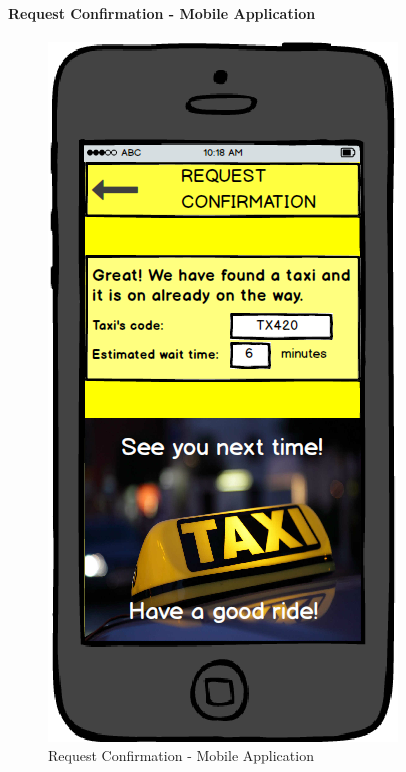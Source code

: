 \paragraph{Request Confirmation - Mobile Application}
\begin{figure}[!h]
	\begin{center}
		\includegraphics[scale=0.5]{../SE2_MOCKUPS/MobileAppRequestConfirmation.png}
		\caption{Request Confirmation - Mobile Application}
	\end{center}	
\end{figure}
\newpage
